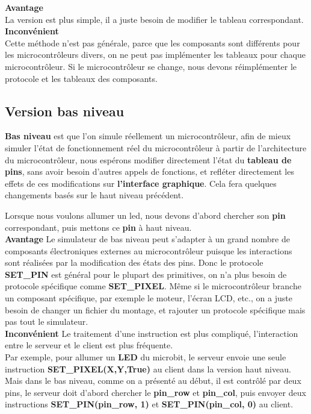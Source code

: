 \documentclass[14px]{article}
\begin{document}
	\textbf{Avantage}\\
	La version est plus simple, il a juste besoin de modifier le tableau correspondant.\\
	
	\textbf{Inconvénient}\\
	Cette méthode n'est pas générale, parce que les composants sont différents pour les microcontrôleurs divers, on ne peut pas implémenter les tableaux pour chaque microcontrôleur.
	Si le microcontrôleur se change, nous devons réimplémenter le protocole et les tableaux des composants.
	
	
	\subsection{Version bas niveau}
	\textbf{Bas niveau} est que l'on simule réellement un microcontrôleur, afin de mieux simuler l'état de fonctionnement réel du microcontrôleur à partir de l'architecture du microcontrôleur, nous espérons modifier directement l'état du \textbf{tableau de pins}, sans avoir besoin d'autres appels de fonctions, et refléter directement les effets de ces modifications sur \textbf{l'interface graphique}. Cela fera quelques changements basés sur le haut niveau précédent.
	
	Lorsque nous voulons allumer un led, nous devons d'abord chercher son \textbf{pin} correspondant, puis mettons ce \textbf{pin} à haut niveau.\\
	
	\textbf{Avantage}
	Le simulateur de bas niveau peut s'adapter à un grand nombre de composants électroniques externes au microcontrôleur puisque les interactions sont réalisées par la modification des états des pins. Donc le protocole \textbf{SET\_PIN} est général pour le plupart des primitives, on n'a plus besoin de protocole spécifique comme \textbf{SET\_PIXEL}. Même si le microcontrôleur branche un composant spécifique, par exemple le moteur, l'écran LCD, etc., on a juste besoin de changer un fichier du montage, et rajouter un protocole spécifique mais pas tout le simulateur.\\
	
	\textbf{Inconvénient}
	Le traitement d'une instruction est plus compliqué, l'interaction entre le serveur et le client est plus fréquente.\\
	Par exemple, pour allumer un \textbf{LED} du microbit, le serveur envoie une seule instruction \textbf{SET\_PIXEL(X,Y,True)} au client dans la version haut niveau. Mais dans le bas niveau, comme on a présenté au début, il est contrôlé par deux pins, le serveur doit d'abord chercher le \textbf{pin\_row} et \textbf{pin\_col}, puis envoyer deux instructions \textbf{SET\_PIN(pin\_row, 1)} et \textbf{SET\_PIN(pin\_col, 0)} au client.
	
\end{document}

